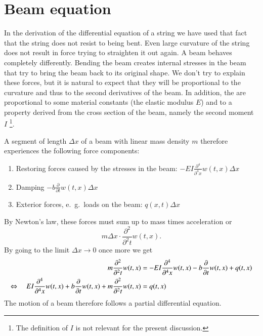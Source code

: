 %
%
%
\section{Beam equation}
In the derivation of the differential equation of a string we
have used that fact that the string does not resist to being
bent.
Even large curvature of the string does not result in force trying
to straighten it out again.
A beam behaves completely differently.
Bending the beam creates internal stresses in the beam that
try to bring the beam back to its original shape.
We don't try to explain these forces, but it is natural to expect that
they will be proportional to the curvature and thus to the second
derivatives of the beam.
In addition, the are proportional to some material constants
(the elastic modulus $E$)
and to a property derived from the cross section of the beam,
namely the second moment $I$%
\footnote{The definition of $I$ is not relevant for the present
discussion.}.

A segment of length $\Delta x$ of a beam with linear mass density $m$
therefore experiences the following force components:
\begin{enumerate}
\item
Restoring forces caused by the stresses in the beam:
$\displaystyle -EI\frac{\partial^4}{\partial^4 x}w(t,x)\Delta x$
\item
Damping
$\displaystyle -b\frac{\partial}{\partial t}w(t,x)\Delta x$
\item
Exterior forces, e.~g.~loads on the beam:
$q(x,t)\Delta x$
\end{enumerate}
By Newton's law, these forces must sum up to mass times acceleration or
\[
m\Delta x\cdot \frac{\partial^2}{\partial^2 t}w(t,x).
\]
By going to the limit $\Delta x\to 0$ once more we get
\begin{align}
m\frac{\partial^2}{\partial^2t}w(t,x)
&=-EI\frac{\partial^4}{\partial^4x}w(t,x)-b\frac{\partial}{\partial t}w(t,x)+q(t,x)
\notag
\\
\Leftrightarrow\quad
EI\frac{\partial^4}{\partial^4x}w(t,x)
+b\frac{\partial}{\partial t}w(t,x)
+m\frac{\partial^2}{\partial^2t}w(t,x)
&=q(t,x)
\label{examples:beam-equation}
\end{align}
The motion of a beam therefore follows a partial differential equation.


